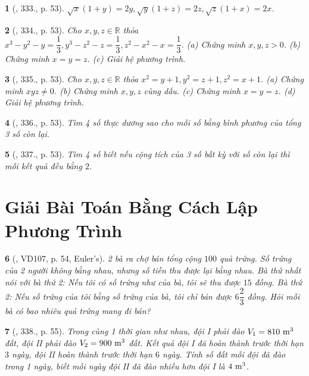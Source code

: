 \documentclass{article}
\newtheorem{baitoan}{}
\begin{document}
\begin{baitoan}[\cite{Binh_Toan_9_tap_2}, 333., p. 53]
	$\sqrt{x}(1 + y) = 2y,\sqrt{y}(1 + z) = 2z,\sqrt{z}(1 + x) = 2x$.
\end{baitoan}

\begin{baitoan}[\cite{Binh_Toan_9_tap_2}, 334., p. 53]
	Cho $x,y,z\in\mathbb{R}$ thỏa $x^3 - y^2 - y = \dfrac{1}{3},y^3 - z^2 - z = \dfrac{1}{3},z^2 - x^2 - x = \dfrac{1}{3}$. (a) Chứng minh $x,y,z > 0$. (b) Chứng minh $x = y = z$. (c) Giải hệ phương trình.
\end{baitoan}

\begin{baitoan}[\cite{Binh_Toan_9_tap_2}, 335., p. 53]
	Cho $x,y,z\in\mathbb{R}$ thỏa $x^2 = y + 1,y^2 = z + 1,z^2 = x + 1$. (a) Chứng minh $xyz\ne0$. (b) Chứng minh $x,y,z$ cùng dấu. (c) Chứng minh $x = y = z$. (d) Giải hệ phương trình.
\end{baitoan}

\begin{baitoan}[\cite{Binh_Toan_9_tap_2}, 336., p. 53]
	Tìm 4 số thực dương sao cho mỗi số bằng bình phương của tổng 3 số còn lại.
\end{baitoan}

\begin{baitoan}[\cite{Binh_Toan_9_tap_2}, 337., p. 53]
	Tìm 4 số biết nếu cộng tích của 3 số bất kỳ với số còn lại thì mỗi kết quả đều bằng $2$.
\end{baitoan}


\section{Giải Bài Toán Bằng Cách Lập Phương Trình}

\begin{baitoan}[\cite{Binh_Toan_9_tap_2}, VD107, p. 54, Euler's]
	2 bà ra chợ bán tổng cộng $100$ quả trứng. Số trứng của 2 người không bằng nhau, nhưng số tiền thu được lại bằng nhau. Bà thứ nhất nói với bà thứ 2: Nếu tôi có số trứng như của bà, tôi sẽ thu được $15$ đồng. Bà thứ 2: Nếu số trứng của tôi bằng số trứng của bà, tôi chỉ bán được $6\dfrac{2}{3}$ đồng. Hỏi mỗi bà có bao nhiêu quả trứng mang đi bán?
\end{baitoan}

\begin{baitoan}[\cite{Binh_Toan_9_tap_2}, 338., p. 55]
	Trong cùng 1 thời gian như nhau, đội I phải đào $V_1 = 810\ {\rm m}^3$ đất, đội II phải đào $V_2 = 900\ {\rm m}^3$ đất. Kết quả đội I đã hoàn thành trước thời hạn $3$ ngày, đội II hoàn thành trước thời hạn $6$ ngày. Tính số đất mỗi đội đã đào trong 1 ngày, biết mỗi ngày đội II đã đào nhiều hơn đội I là $\rm4\ m^3$.
\end{baitoan}
\end{document}
